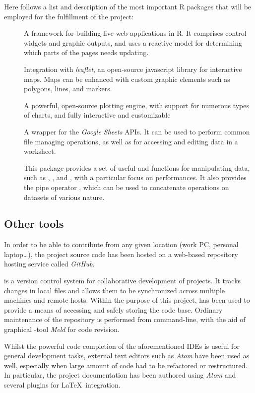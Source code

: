Here follows a list and description of the most important R packages that will be employed for the fulfillment of the project:

\begin{description}
	\item[] A framework for building live web applications in R. It comprises control widgets and graphic outputs, and uses a reactive model for determining which parts of the pages needs updating.
	\item[] Integration with \emph{leaflet}, an open-source javascript library for interactive maps. Maps can be enhanced with custom graphic elements such as polygons, lines, and markers.
	\item[] A powerful, open-source plotting engine, with support for numerous types of charts, and fully interactive and customizable
	\item[] A wrapper for the \emph{Google Sheets} APIs. It can be used to perform common file managing operations, as well as for accessing and editing data in a worksheet.
	\item[] This package provides a set of useful and functions for manipulating data, such as , , and , with a particular focus on performances. It also provides the pipe operator \code{\%>\%}, which can be used to concatenate operations on datasets of various nature.
\end{description}


\subsection{Other tools}
In order to be able to contribute from any given location (work PC, personal laptop\dots), the project source code has been hosted on a web-based  repository hosting service called \emph{GitHub}.

 is a version control system for collaborative development of projects.
It tracks changes in local files and allows them to be synchronized across multiple machines and remote hosts.
Within the purpose of this project,  has been used to provide a means of accessing and safely storing the code base.
Ordinary maintenance of the repository is performed from command-line, with the aid of graphical -tool \emph{Meld} for code revision.

Whilst the powerful code completion of the aforementioned IDEs is useful for general development tasks, external text editors such as \emph{Atom} have been used as well, especially when large amount of code had to be refactored or restructured.
In particular, the project documentation has been authored using \emph{Atom} and several plugins for \LaTeX\ integration.
